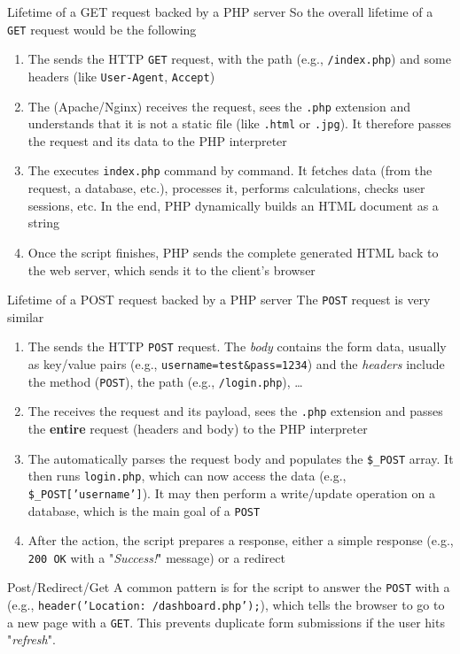 \begin{parag}{Lifetime of a GET request backed by a PHP server}
    So the overall lifetime of a \texttt{GET} request would be the following
    \begin{enumerate}
        \item The  sends the HTTP \texttt{GET} request, with the path (e.g., \texttt{/index.php}) and some headers (like \texttt{User-Agent}, \texttt{Accept})
        \item The  (Apache/Nginx) receives the request, sees the \texttt{.php} extension and understands that it is not a static file (like \texttt{.html} or \texttt{.jpg}). It therefore passes the request and its data to the PHP interpreter
        \item The  executes \texttt{index.php} command by command. It fetches data (from the request, a database, etc.), processes it, performs calculations, checks user sessions, etc. In the end, PHP dynamically builds an HTML document as a string
        \item Once the script finishes, PHP sends the complete generated HTML back to the web server, which sends it to the client's browser
    \end{enumerate}
\end{parag}

\begin{parag}{Lifetime of a POST request backed by a PHP server}
    The \texttt{POST} request is very similar
    \begin{enumerate}
        \item The  sends the HTTP \texttt{POST} request. The \textit{body} contains the form data, usually as key/value pairs (e.g., \texttt{username=test\&pass=1234}) and the \textit{headers} include the method (\texttt{POST}), the path (e.g., \texttt{/login.php}), \dots
        \item The  receives the request and its payload, sees the \texttt{.php} extension and passes the \textbf{entire} request (headers and body) to the PHP interpreter
        \item The  automatically parses the request body and populates the \texttt{\$\_POST} array. It then runs \texttt{login.php}, which can now access the data (e.g., \texttt{\$\_POST['username']}). It may then perform a write/update operation on a database, which is the main goal of a \texttt{POST}
        \item After the action, the script prepares a response, either a simple response (e.g., \texttt{200 OK} with a "\textit{Success!}" message) or a redirect
    \end{enumerate}
    \begin{subparag}{Post/Redirect/Get}
        A common pattern is for the script to answer the \texttt{POST} with a  (e.g., \texttt{header('Location: /dashboard.php');}), which tells the browser to go to a new page with a \texttt{GET}. This prevents duplicate form submissions if the user hits "\textit{refresh}".
    \end{subparag}
\end{parag}


